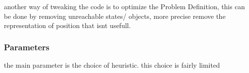 	
	
	another way of tweaking the code is to optimize the Problem Definition, this can be done by removing unreachable states/ objects, more precise remove the representation of position that isnt usefull.
	
	
	

	\subsubsection{Parameters}
	the main parameter is the choice of heuristic. this choice is fairly limited 
	

	
	
